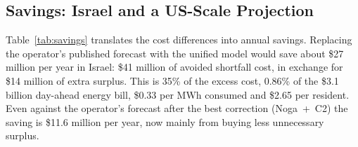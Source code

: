 \subsection{Savings: Israel and a US-Scale Projection}
\label{sec:savings}

Table~\ref{tab:savings} translates the cost differences into annual savings.
Replacing the operator's published forecast with the unified model would save
about \$27 million per year in Israel: \$41 million of avoided shortfall cost,
in exchange for \$14 million of extra surplus.  This is 35\% of the excess
cost, 0.86\% of the \$3.1 billion day-ahead energy bill, \$0.33 per MWh
consumed and \$2.65 per resident.  Even against the operator's forecast after
the best correction (Noga~+~C2) the saving is \$11.6 million per year, now
mainly from buying less unnecessary surplus.

\begin{table}[t]
    \centering
    \small
    \caption{Annual savings of the unified model on the test year (positive:
             the unified model is cheaper), split into under- and
             over-prediction, and normalised per MWh consumed (81~TWh) and per
             resident (10.2~million).  The last column projects the saving per
             MWh to US consumption (about 4{,}100~TWh per year).}
    \label{tab:savings}
\end{table}

